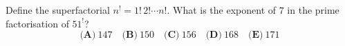Define the superfactorial $n^{!}=1!\,2!\cdots n!$. What is the exponent of $7$ in the prime factorisation of $51^{!}$?
\[\textbf{(A)}\ 147\quad\textbf{(B)}\ 150\quad\textbf{(C)}\ 156\quad\textbf{(D)}\ 168\quad\textbf{(E)}\ 171\]
